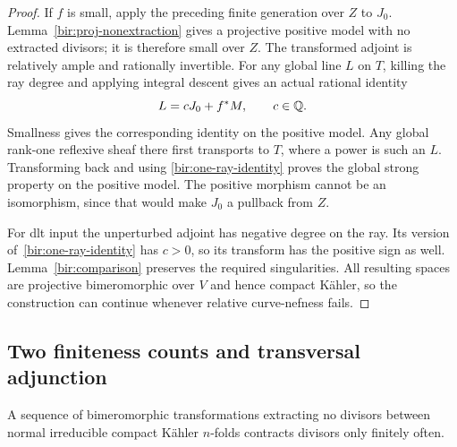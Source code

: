 \begin{proof}
If $f$ is small, apply the preceding finite generation over $Z$ to
$J_0$.  Lemma~\ref{bir:proj-nonextraction} gives a projective positive
model with no extracted divisors; it is therefore small over $Z$.
The transformed adjoint is relatively ample and rationally invertible.
For any global line $L$ on $T$, killing the ray degree and applying
integral descent gives an actual rational identity
\begin{equation}
 L=cJ_0+f^*M,\qquad c\in\mathbb{Q}.
 \label{bir:one-ray-identity}
\end{equation}
Smallness gives the corresponding identity on the positive model.
Any global rank-one reflexive sheaf there first transports to $T$,
where a power is such an $L$.  Transforming back and using
\eqref{bir:one-ray-identity} proves the global strong property on the
positive model.  The positive morphism cannot be an isomorphism,
since that would make $J_0$ a pullback from $Z$.

For dlt input the unperturbed adjoint has negative degree on the ray.
Its version of~\eqref{bir:one-ray-identity} has $c>0$, so its transform
has the positive sign as well.  Lemma~\ref{bir:comparison} preserves
the required singularities.  All resulting spaces are projective
bimeromorphic over $V$ and hence compact K\"ahler, so the construction
can continue whenever relative curve-nefness fails.
\end{proof}

\subsection{Two finiteness counts and transversal adjunction}
\label{bir:counts}

\begin{lemma}
\label{bir:cycle-count}
A sequence of bimeromorphic transformations extracting no divisors
between normal irreducible compact K\"ahler $n$-folds contracts
divisors only finitely often.
\end{lemma}


